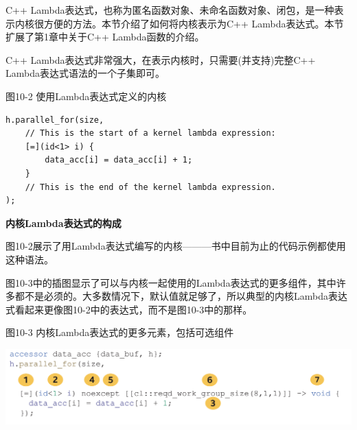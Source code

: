 C++ Lambda表达式，也称为匿名函数对象、未命名函数对象、闭包，是一种表示内核很方便的方法。本节介绍了如何将内核表示为C++ Lambda表达式。本节扩展了第1章中关于C++ Lambda函数的介绍。\par

C++ Lambda表达式非常强大，在表示内核时，只需要(并支持)完整C++ Lambda表达式语法的一个子集即可。\par

\hspace*{\fill} \par %
图10-2 使用Lambda表达式定义的内核
\begin{lstlisting}[caption={}]
h.parallel_for(size,
	// This is the start of a kernel lambda expression:
	[=](id<1> i) {
		data_acc[i] = data_acc[i] + 1;
	}
	// This is the end of the kernel lambda expression.
);
\end{lstlisting}

\hspace*{\fill} \par %
\textbf{内核Lambda表达式的构成}

图10-2展示了用Lambda表达式编写的内核———书中目前为止的代码示例都使用这种语法。\par

图10-3中的插图显示了可以与内核一起使用的Lambda表达式的更多组件，其中许多都不是必须的。大多数情况下，默认值就足够了，所以典型的内核Lambda表达式看起来更像图10-2中的表达式，而不是图10-3中的那样。\par

\hspace*{\fill} \par %
图10-3 内核Lambda表达式的更多元素，包括可选组件
\begin{center}
	\includegraphics[width=1.0\textwidth]{content/chapter-10/images/2}
\end{center}

